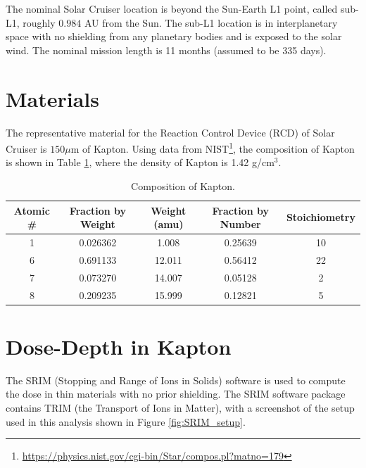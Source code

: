 \documentclass{hitec}
\begin{document}
The nominal Solar Cruiser location is beyond the Sun-Earth L1 point, called sub-L1, roughly $0.984$ AU from the Sun. The sub-L1 location is in interplanetary space with no shielding from any planetary bodies and is exposed to the solar wind. The nominal mission length is 11 months (assumed to be 335 days).

\section{Materials}
\label{sec:Materials}
The representative material for the Reaction Control Device (RCD) of Solar Cruiser is $150 \mu\text{m}$ of Kapton. Using data from NIST\footnote{\url{https://physics.nist.gov/cgi-bin/Star/compos.pl?matno=179}}, the composition of Kapton is shown in Table \ref{tab:Kapton_composition}, where the density of Kapton is 1.42 g/cm$^3$.

\begin{table}[!h]\centering
	\caption{Composition of Kapton.}\label{tab:Kapton_composition}
	\begin{tabular}{|c | c | c | c | c |}\hline
		Atomic \# & Fraction by Weight & Weight (amu) & Fraction by Number & Stoichiometry\\\hline
		1	& 0.026362	&  1.008 & 0.25639 & 10\\\hline
		6	& 0.691133	& 12.011 & 0.56412 & 22\\\hline
		7	& 0.073270	& 14.007 & 0.05128 &  2\\\hline
		8	& 0.209235	& 15.999 & 0.12821 &  5\\\hline	
	\end{tabular}
\end{table}

\section{Dose-Depth in Kapton}

The SRIM (Stopping and Range of Ions in Solids) software is used to compute the dose in thin materials with no prior shielding. The SRIM software package contains TRIM (the Transport of Ions in Matter), with a screenshot of the setup used in this analysis shown in Figure \ref{fig:SRIM_setup}.
\end{document}
